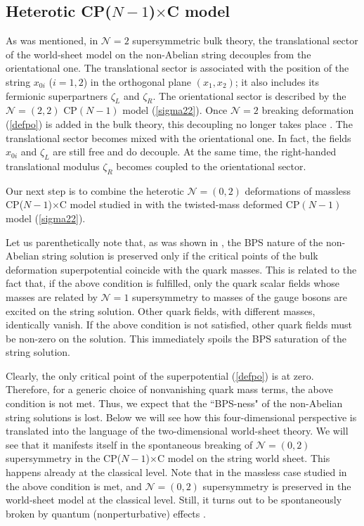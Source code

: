 \documentclass[12pt]{article}
\newcommand{\ntwo}{${\mathcal N}=2$ }
\newcommand{\ntwot}{${\mathcal N}= \left(2,2\right) $ }
\newcommand{\ntwoo}{${\mathcal N}= \left(0,2\right) $ }
\newcommand{\ntwoon}{${\mathcal N}= \left(0,2\right) $}
\newcommand{\none}{${\mathcal N}=1$ }
\newcommand{\CPC}{CP($N-1$)$\times$C }
\begin{document}
 

\subsection{ Heterotic \boldmath{\ntwoon} \CPC  model}
\label{hbmnt}

As was mentioned, in   \ntwo supersymmetric bulk theory, the translational
sector of the world-sheet model on the non-Abelian string 
decouples from the orientational one. The translational sector is
associated with the position of the string $x_{0i}$  ($i=1,2$) in the orthogonal plane $(x_1,x_2)$; 
it also includes its fermionic superpartners
$\zeta_L$ and $\zeta_R$. 
The orientational sector is described by the \ntwot CP$(N-1)$ model (\ref{sigma22}). Once \ntwo
breaking deformation (\ref{defpo})
is added in the bulk theory, this decoupling no longer takes place \cite{Edalati}. The translational sector becomes
mixed with the orientational one. In fact, the  fields $x_{0i}$ and 
$\zeta_L$ are still free and do decouple. At the same time,  the 
right-handed translational modulus $\zeta_R$ becomes coupled to
the orientational sector. 

Our next step is to combine the heterotic \ntwoo deformations of massless
\CPC model studied in \cite{Edalati, SYhet,SYhetlN,BSYhet}
with the twisted-mass deformed CP$(N-1)$ model  (\ref{sigma22}).

Let us parenthetically note that, as was shown in \cite{Edalati,SYhet}, 
 the BPS nature of the non-Abelian   string solution is preserved only
if the critical points of the bulk deformation superpotential coincide with the quark masses. 
This is related to the fact that,
if the above condition is fulfilled,  only the  quark scalar fields whose masses are related by \none supersymmetry
to masses of the  gauge bosons are  excited on the string solution.
Other quark fields, with different masses, identically vanish. If the
above condition is not satisfied, other quark fields must be  
non-zero on the solution. This immediately spoils the BPS saturation of the string solution.

Clearly, the only critical point  of the superpotential (\ref{defpo})
is at zero. Therefore, for a generic   choice of nonvanishing
quark mass terms, the above condition is not met. 
Thus, we expect
that the ``BPS-ness" of the non-Abelian string solutions is lost. Below  
  we will see how this four-dimensional
  perspective is translated into the language of the two-dimensional
 world-sheet theory. We will
see that it manifests itself in the spontaneous breaking of 
\ntwoo supersymmetry in the \CPC model on the string world sheet. 
This happens already at the classical level. Note that in the massless case studied in \cite{SYhet,BSYhet} the above 
condition is met, and \ntwoo supersymmetry is preserved
in the world-sheet model at the classical level. Still, it turns
out to be spontaneously broken by quantum (nonperturbative)
effects 
\cite{Tongd,SYhet,SYhetlN}.
\end{document}
